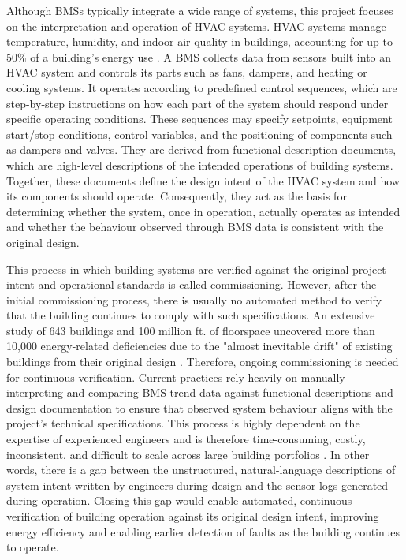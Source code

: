 \documentclass{article}
\begin{document}
Although BMSs typically integrate a wide range of systems, this project focuses on the interpretation and operation of HVAC systems. HVAC systems manage temperature, humidity, and indoor air quality in buildings, accounting for up to 50\% of a building's energy use \parencite{energygovau_hvac}. A BMS collects data from sensors built into an HVAC system and controls its parts such as fans, dampers, and heating or cooling systems. It operates according to predefined control sequences, which are step-by-step instructions on how each part of the system should respond under specific operating conditions. These sequences may specify setpoints, equipment start/stop conditions, control variables, and the positioning of components such as dampers and valves. They are derived from functional description documents, which are high-level descriptions of the intended operations of building systems. Together, these documents define the design intent of the HVAC system and how its components should operate. Consequently, they act as the basis for determining whether the system, once in operation, actually operates as intended and whether the behaviour observed through BMS data is consistent with the original design.

This process in which building systems are verified against the original project intent and operational standards is called commissioning. However, after the initial commissioning process, there is usually no automated method to verify that the building continues to comply with such specifications. An extensive study of 643 buildings and 100 million ft. of floorspace uncovered more than 10,000 energy-related deficiencies due to the "almost inevitable drift" of existing buildings from their original design \parencite{mills2009}. Therefore, ongoing commissioning is needed for continuous verification. Current practices rely heavily on manually interpreting and comparing BMS trend data against functional descriptions and design documentation to ensure that observed system behaviour aligns with the project's technical specifications. This process is highly dependent on the expertise of experienced engineers and is therefore time-consuming, costly, inconsistent, and difficult to scale across large building portfolios \parencite{zibin2016}. In other words, there is a gap between the unstructured, natural-language descriptions of system intent written by engineers during design and the sensor logs generated during operation. Closing this gap would enable automated, continuous verification of building operation against its original design intent, improving energy efficiency and enabling earlier detection of faults as the building continues to operate.
\end{document}
